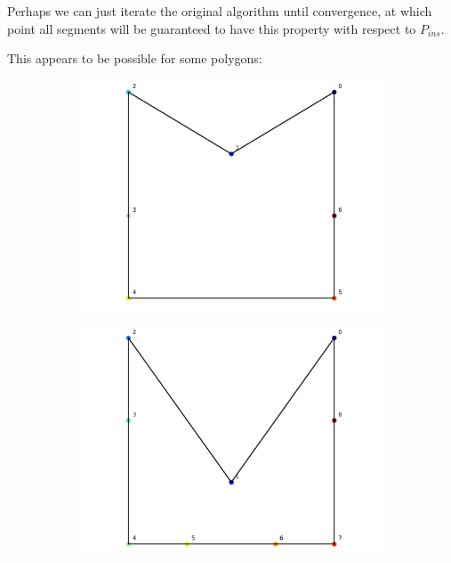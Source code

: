 \documentclass[]{article}  %
\begin{document}
Perhaps we can just iterate the original algorithm until convergence, at which
point all segments will be guaranteed to have this property with respect to
$P_{ins}$.

This appears to be possible for some polygons:

\begin{figure}
\centering
\begin{subfigure}{0.6\textwidth}
  \includegraphics[width=\textwidth]{figures/iter1.png}
\end{subfigure}

\begin{subfigure}{0.6\textwidth}
  \includegraphics[width=\linewidth]{figures/iter2.png}
\end{subfigure}


\end{figure}
\end{document}
